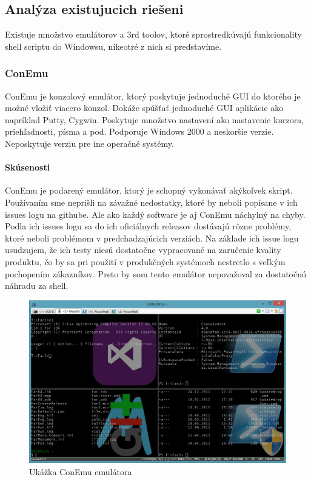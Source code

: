 \subsection{Analýza existujucich riešeni}
\indent
Existuje množstvo emulátorov a 3rd toolov, ktoré sprostredkúvajú funkcionality shell scriptu do Windowsu, nikeotré z nich si predstavíme.

\subsubsection{ConEmu}
\indent ConEmu je konzolový emulátor, ktorý poskytuje jednoduché GUI do ktorého je možné vložiť viacero konzol. Dokáže spúšťať jednoduché GUI aplikácie ako napríklad Putty, Cygwin. Poskytuje množstvo nastavení ako nastavenie kurzora, priehľadnosti, písma a pod. Podporuje Windows 2000 a neskoršie verzie. Neposkytuje verziu pre ine operačné systémy.
\paragraph{Skúsenosti}
\indent ConEmu je podarený emulátor, ktorý je schopný vykonávať akýkoľvek skript. Používaním sme neprišli na závažné nedostatky, ktoré by neboli popísane v ich issues logu na githube. Ale ako každý software je aj ConEmu náchylný na chyby. Podla ich issues logu sa do ich oficiálnych releasov dostávajú rôzne problémy, ktoré neboli problémom v predchadzajúcich verziách. Na základe ich issue logu usudzujem, že ich testy niesú dostatočne vypracované na zaručenie kvality produktu, čo by sa pri použití v produkčných systémoch nestretlo s veľkým pochopením zákazníkov. Preto by som tento emulátor nepovažoval za dostatočnú náhradu za shell.

\begin{figure}[!htbp]
\centering
\includegraphics[scale=0.3]{img/conEmuImg.jpg}
\caption{Ukážka ConEmu emulátora}
\label{fig:test}
\end{figure}
\newpage
